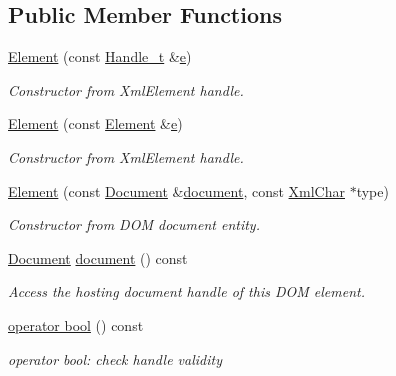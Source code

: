 \subsection*{Public Member Functions}
\begin{DoxyCompactItemize}
\item 
\hyperlink{class_d_d4hep_1_1_x_m_l_1_1_element_aa30c6619a40cf7e61e6e07d2f21277e5}{Element} (const \hyperlink{class_d_d4hep_1_1_x_m_l_1_1_handle__t}{Handle\+\_\+t} \&\hyperlink{_volumes_8cpp_a8a9a1f93e9b09afccaec215310e64142}{e})
\begin{DoxyCompactList}\small\item\em Constructor from Xml\+Element handle. \end{DoxyCompactList}\item 
\hyperlink{class_d_d4hep_1_1_x_m_l_1_1_element_abc4154273029baf538d1f9b68e6196a6}{Element} (const \hyperlink{class_d_d4hep_1_1_x_m_l_1_1_element}{Element} \&\hyperlink{_volumes_8cpp_a8a9a1f93e9b09afccaec215310e64142}{e})
\begin{DoxyCompactList}\small\item\em Constructor from Xml\+Element handle. \end{DoxyCompactList}\item 
\hyperlink{class_d_d4hep_1_1_x_m_l_1_1_element_a9f3edfe23e1514d285b10a20932875e7}{Element} (const \hyperlink{class_d_d4hep_1_1_x_m_l_1_1_document}{Document} \&\hyperlink{class_d_d4hep_1_1_x_m_l_1_1_element_a39ec92855a00b5485ed4791ae09569a8}{document}, const \hyperlink{namespace_d_d4hep_1_1_x_m_l_a09e5d9cc86ed782f6826dfe0778c1815}{Xml\+Char} $\ast$type)
\begin{DoxyCompactList}\small\item\em Constructor from D\+OM document entity. \end{DoxyCompactList}\item 
\hyperlink{class_d_d4hep_1_1_x_m_l_1_1_document}{Document} \hyperlink{class_d_d4hep_1_1_x_m_l_1_1_element_a39ec92855a00b5485ed4791ae09569a8}{document} () const
\begin{DoxyCompactList}\small\item\em Access the hosting document handle of this D\+OM element. \end{DoxyCompactList}\item 
\hyperlink{class_d_d4hep_1_1_x_m_l_1_1_element_ae0a93b8933ce7644f19547b716242d47}{operator bool} () const
\begin{DoxyCompactList}\small\item\em operator bool\+: check handle validity \end{DoxyCompactList}\item 

\end{DoxyCompactItemize}
